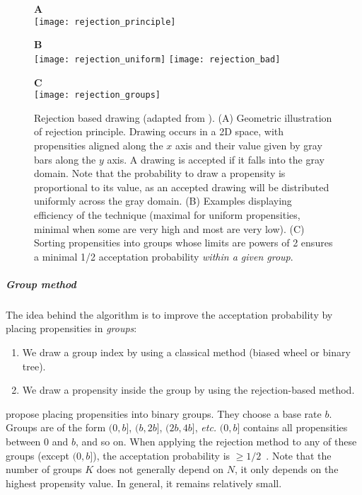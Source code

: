 \begin{figure}[!h]
  \centering
  \begin{minipage}{0.59\textwidth}
    \textbf{A} \\
    \texttt{[image: rejection\_principle]}
  \end{minipage}
  \begin{minipage}{0.39\textwidth}
    \textbf{B} \\
    \texttt{[image: rejection\_uniform]}
    \texttt{[image: rejection\_bad]}
  \end{minipage}
  \begin{minipage}{0.6\textwidth}
    \textbf{C}\\
    \texttt{[image: rejection\_groups]}
  \end{minipage}
  \caption{Rejection based drawing (adapted from \citet{slepoy_constant-time_2008}). (A) Geometric illustration of rejection principle. Drawing occurs in a 2D space, with propensities aligned along the $x$ axis and their value given by gray bars along the $y$ axis. A drawing is accepted if it falls into the gray domain. Note that the probability to draw a propensity is proportional to its value, as an accepted drawing will be distributed uniformly across the gray domain. (B) Examples displaying efficiency of the technique (maximal for uniform propensities, minimal when some are very high and most are very low). (C) Sorting propensities into groups whose limits are powers of 2 ensures a minimal 1/2 acceptation probability \emph{within a given group}.}
  \label{fig:rejection_based_drawing}
\end {figure}

 \subparagraph{Group method} The idea behind the algorithm is to improve the acceptation probability by placing propensities in \emph{groups}:
\begin{enumerate}
\item We draw a group index by using a classical method (biased wheel or binary tree).
\item We draw a propensity inside the group by using the rejection-based method.
\end{enumerate}

\citet{slepoy_constant-time_2008} propose placing propensities into binary groups. They choose a base rate $b$. Groups are of the form $(0, b]$, $(b, 2b]$, $(2b, 4b]$, \textit{etc.} $(0,b]$ contains all propensities between 0 and $b$, and so on. When applying the rejection method to any of these groups (except $(0, b]$), the acceptation probability is $\geq 1/2$~. Note that the number of groups $K$ does not generally depend on $N$, it only depends on the highest propensity value. In general, it remains relatively small.

